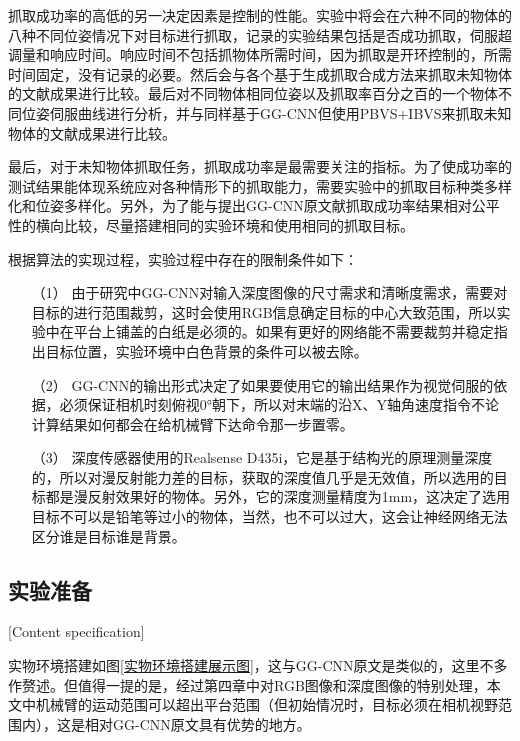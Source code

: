 \documentclass[fontset=fandol,type=bachelor,campus=harbin,bsmainpagenumberline=true]{hithesisbook}
\begin{document}
抓取成功率的高低的另一决定因素是控制的性能。实验中将会在六种不同的物体的八种不同位姿情况下对目标进行抓取，记录的实验结果包括是否成功抓取，伺服超调量和响应时间。响应时间不包括抓物体所需时间，因为抓取是开环控制的，所需时间固定，没有记录的必要。然后会与各个基于生成抓取合成方法来抓取未知物体的文献成果进行比较。最后对不同物体相同位姿以及抓取率百分之百的一个物体不同位姿伺服曲线进行分析，并与同样基于GG-CNN但使用PBVS+IBVS来抓取未知物体的文献成果\cite{haviland2020control}进行比较。


最后，对于未知物体抓取任务，抓取成功率是最需要关注的指标。为了使成功率的测试结果能体现系统应对各种情形下的抓取能力，需要实验中的抓取目标种类多样化和位姿多样化。另外，为了能与提出GG-CNN原文献抓取成功率结果相对公平性的横向比较，尽量搭建相同的实验环境和使用相同的抓取目标。


根据算法的实现过程，实验过程中存在的限制条件如下：
\begin{itemize}
\item[（1）]
由于研究中GG-CNN对输入深度图像的尺寸需求和清晰度需求，需要对目标的进行范围裁剪，这时会使用RGB信息确定目标的中心大致范围，所以实验中在平台上铺盖的白纸是必须的。如果有更好的网络能不需要裁剪并稳定指出目标位置，实验环境中白色背景的条件可以被去除。
\item[（2）]
GG-CNN的输出形式决定了如果要使用它的输出结果作为视觉伺服的依据，必须保证相机时刻俯视0°朝下，所以对末端的沿X、Y轴角速度指令不论计算结果如何都会在给机械臂下达命令那一步置零。
\item[（3）]
深度传感器使用的Realsense D435i，它是基于结构光的原理测量深度的，所以对漫反射能力差的目标，获取的深度值几乎是无效值，所以选用的目标都是漫反射效果好的物体。另外，它的深度测量精度为1mm，这决定了选用目标不可以是铅笔等过小的物体，当然，也不可以过大，这会让神经网络无法区分谁是目标谁是背景。
\end{itemize}
\subsection{实验准备}[Content specification]



实物环境搭建如图\ref{实物环境搭建展示图}，这与GG-CNN原文是类似的，这里不多作赘述。但值得一提的是，经过第四章中对RGB图像和深度图像的特别处理，本文中机械臂的运动范围可以超出平台范围（但初始情况时，目标必须在相机视野范围内），这是相对GG-CNN原文具有优势的地方。
\end{document}
